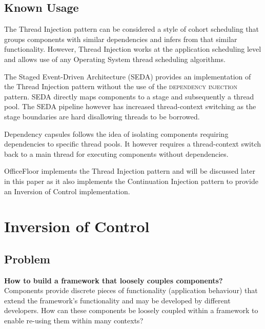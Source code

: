 \documentclass[prodmode]{style/acmlarge}
\begin{document}
\subsection{Known Usage}

The Thread Injection pattern can be considered a style of cohort scheduling
\cite{cohort} that groups components with similar dependencies and infers from
that similar functionality.  However, Thread Injection works at the application
scheduling level and allows use of any Operating System thread scheduling
algorithms.

The Staged Event-Driven Architecture (SEDA) \cite{seda} provides an
implementation of the Thread Injection pattern without the use of the
\textsc{dependency injection} pattern.  SEDA directly maps components to a stage
and subsequently a thread pool.  The SEDA pipeline however has increased
thread-context switching as the stage boundaries are hard disallowing threads to
be borrowed.

Dependency capsules \cite{dependency-capsules} follows the idea of isolating
components requiring dependencies to specific thread pools.  It however requires
a thread-context switch back to a main thread for executing components without
dependencies.

OfficeFloor \cite{officefloor} implements the Thread Injection pattern and will
be discussed later in this paper as it also implements the Continuation
Injection pattern to provide an Inversion of Control implementation.



\section{Inversion of Control}


\subsection{Problem}

\textbf{How to build a framework that loosely couples components?} Components
provide discrete pieces of functionality (application behaviour) that extend the
framework's functionality and may be developed by different developers.  How can
these components be loosely coupled within a framework to enable re-using them
within many contexts?
\end{document}
